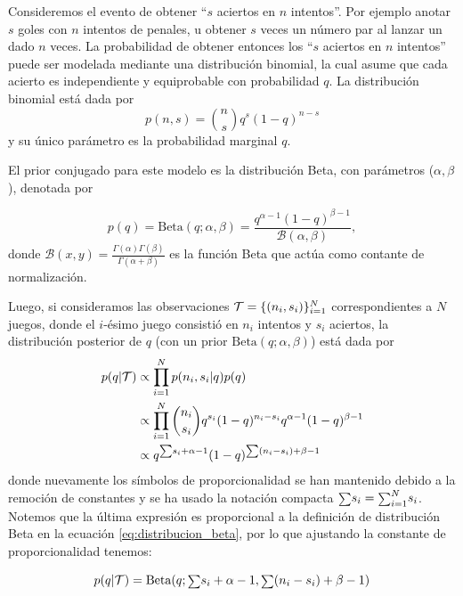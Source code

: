 Consideremos el evento de obtener ``$s$ aciertos en $n$ intentos''. Por ejemplo anotar $s$ goles con $n$ intentos de penales, u obtener $s$ veces un número par al lanzar un dado $n$ veces. La probabilidad de obtener entonces los ``$s$ aciertos en $n$ intentos'' puede ser modelada mediante una distribución binomial, la cual asume que cada acierto es independiente y  equiprobable con probabilidad $q$. La distribución binomial está dada por
\begin{equation}
	p(n, s) = \binom{n}{s} q^s (1-q)^{n-s}
\end{equation}
y su único parámetro es la probabilidad marginal $q$.

El prior conjugado para este modelo es la distribución Beta, con parámetros ($\alpha, \beta$), denotada por 

\begin{equation}
	p(q) = \text{Beta}(q;\alpha,\beta) = \frac{q^{\alpha-1}(1-q)^{\beta-1}}{\mathcal{B}(\alpha, \beta)},
	\label{eq:distribucion_beta}
\end{equation}
donde $\mathcal{B}(x,y) = \frac{\Gamma(\alpha)\Gamma(\beta)}{\Gamma(\alpha+\beta)}$ es la función Beta que actúa como contante de normalización.


Luego, si consideramos las observaciones ${\mathcal T} = \{(n_i,s_i)\}_{i=1}^N$ correspondientes a $N$ juegos, donde el $i$-ésimo juego consistió en $n_i$ intentos y $s_i$ aciertos, la distribución posterior de $q$ (con un prior $\text{Beta}(q;\alpha,\beta)$) está dada por
\begin{align}
	p(q|{\mathcal T}) & 	\propto \prod_{i=1}^N  p(n_i,s_i|q)p(q)  \\
			 & \propto  \prod_{i=1}^N\binom{n_i}{s_i}q^{s_i}(1-q)^{n_i-s_i}q^{\alpha-1}(1-q)^{\beta-1} \nonumber\\
			 & \propto  q^{{\scriptstyle\sum} s_i + \alpha - 1}(1-q)^{{\scriptstyle\sum} (n_i-s_i) + \beta-1} \nonumber
\end{align}
donde nuevamente los símbolos de proporcionalidad se han mantenido debido a la remoción de constantes y se ha usado la notación compacta ${\scriptstyle\sum} s_i = {\scriptstyle\sum}_{i=1}^N s_i$. Notemos que la última expresión es proporcional a la definición de distribución Beta en la ecuación \eqref{eq:distribucion_beta}, por lo que ajustando la constante de proporcionalidad tenemos: 

\begin{equation}
	p(q|{\mathcal T}) = \text{Beta}(q;{\scriptstyle\sum} s_i + \alpha - 1,{\scriptstyle\sum} (n_i-s_i) + \beta-1)
\end{equation}




